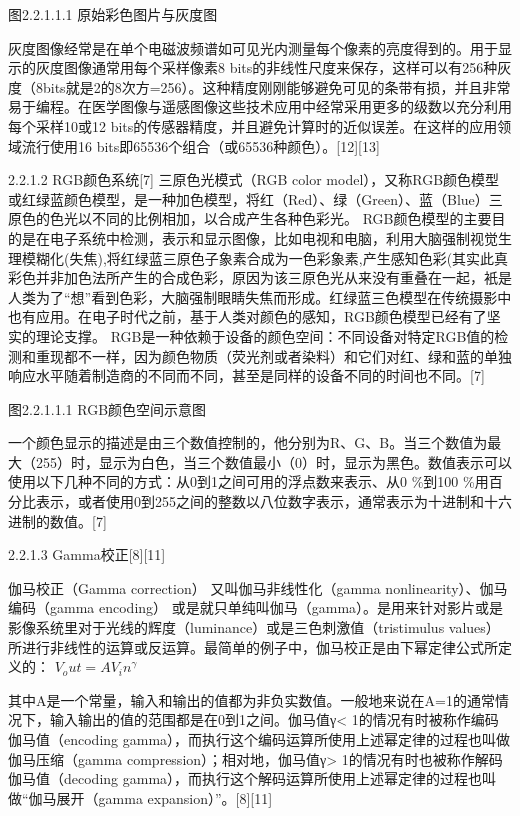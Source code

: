 图2.2.1.1.1 原始彩色图片与灰度图

灰度图像经常是在单个电磁波频谱如可见光内测量每个像素的亮度得到的。用于显示的灰度图像通常用每个采样像素8 bits的非线性尺度来保存，这样可以有256种灰度（8bits就是2的8次方=256）。这种精度刚刚能够避免可见的条带有损，并且非常易于编程。在医学图像与遥感图像这些技术应用中经常采用更多的级数以充分利用每个采样10或12 bits的传感器精度，并且避免计算时的近似误差。在这样的应用领域流行使用16 bits即65536个组合（或65536种颜色）。[12][13]

2.2.1.2 RGB颜色系统[7]
	三原色光模式（RGB color model），又称RGB颜色模型或红绿蓝颜色模型，是一种加色模型，将红（Red）、绿（Green）、蓝（Blue）三原色的色光以不同的比例相加，以合成产生各种色彩光。
RGB颜色模型的主要目的是在电子系统中检测，表示和显示图像，比如电视和电脑，利用大脑强制视觉生理模糊化(失焦),将红绿蓝三原色子象素合成为一色彩象素,产生感知色彩(其实此真彩色并非加色法所产生的合成色彩，原因为该三原色光从来没有重叠在一起，衹是人类为了“想”看到色彩，大脑强制眼睛失焦而形成。红绿蓝三色模型在传统摄影中也有应用。在电子时代之前，基于人类对颜色的感知，RGB颜色模型已经有了坚实的理论支撑。
RGB是一种依赖于设备的颜色空间：不同设备对特定RGB值的检测和重现都不一样，因为颜色物质（荧光剂或者染料）和它们对红、绿和蓝的单独响应水平随着制造商的不同而不同，甚至是同样的设备不同的时间也不同。[7]
     
图2.2.1.1.1 RGB颜色空间示意图

一个颜色显示的描述是由三个数值控制的，他分别为R、G、B。当三个数值为最大（255）时，显示为白色，当三个数值最小（0）时，显示为黑色。数值表示可以使用以下几种不同的方式：从0到1之间可用的浮点数来表示、从0 \%到100 \%用百分比表示，或者使用0到255之间的整数以八位数字表示，通常表示为十进制和十六进制的数值。[7]

2.2.1.3 Gamma校正[8][11]
	
	伽马校正（Gamma correction） 又叫伽马非线性化（gamma nonlinearity）、伽马编码（gamma encoding） 或是就只单纯叫伽马（gamma）。是用来针对影片或是影像系统里对于光线的辉度（luminance）或是三色刺激值（tristimulus values）所进行非线性的运算或反运算。最简单的例子中，伽马校正是由下幂定律公式所定义的：
$V_out=AV_in^γ$
	
	其中A是一个常量，输入和输出的值都为非负实数值。一般地来说在A=1的通常情况下，输入输出的值的范围都是在0到1之间。伽马值γ< 1的情况有时被称作编码伽马值（encoding gamma），而执行这个编码运算所使用上述幂定律的过程也叫做伽马压缩（gamma compression）；相对地，伽马值γ> 1的情况有时也被称作解码伽马值（decoding gamma），而执行这个解码运算所使用上述幂定律的过程也叫做“伽马展开（gamma expansion）”。[8][11]
	
